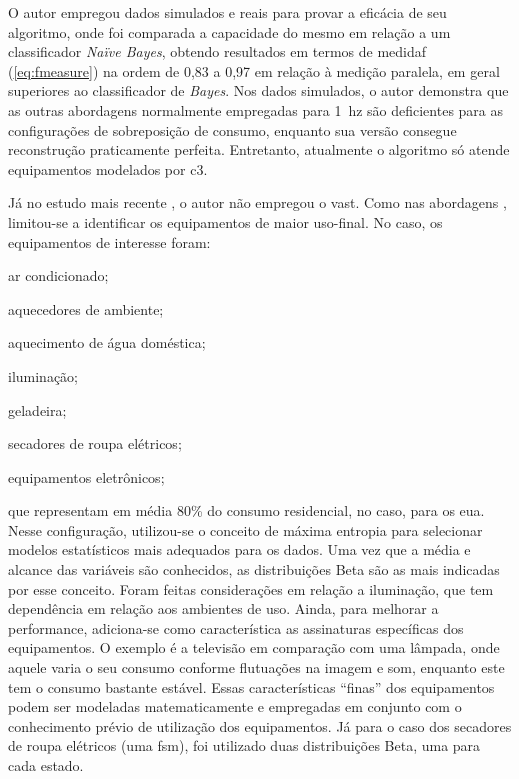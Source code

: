 \begin{enumerate}[label=\textbf{1.\arabic*},wide=\parindent]
O autor empregou dados simulados e reais para provar a eficácia de seu
algoritmo, onde foi comparada a capacidade do mesmo em relação a um
classificador \emph{Naïve Bayes}, obtendo resultados em termos de
\acs{medidaf} (\ref{eq:fmeasure}) na ordem de 0,83 a 0,97 em relação à
medição paralela, em geral superiores ao classificador de
\emph{Bayes}. Nos dados simulados, o autor demonstra que as outras
abordagens normalmente empregadas para 1~\acs{hz} são deficientes para
as configurações de sobreposição de consumo, enquanto sua versão
consegue reconstrução praticamente perfeita. Entretanto, atualmente o
algoritmo só atende equipamentos modelados por \gls{c3}.

Já no estudo mais recente
\cite{nilm_zeifman_statistical_naive_enduses_2013}, o autor não
empregou o \gls{vast}. Como nas abordagens \cite{nilm_farinaccio_16ssamp_1999_17,
nilm_marceau_16ssamp_improved_1999_18}, limitou-se a identificar os
equipamentos de maior uso-final. No caso, os equipamentos de interesse foram:
\begin{enumerate*}[label=\itshape\alph*\upshape)]
\item ar condicionado;
\item aquecedores de ambiente;
\item aquecimento de água doméstica;
\item \label{itm:iluminacao} iluminação;
\item geladeira;
\item secadores de roupa elétricos;
\item \label{itm:equipamentoeletronico} equipamentos eletrônicos;
\end{enumerate*} que representam em média 80\% do consumo residencial,
no caso, para os \gls{eua}. Nesse configuração, utilizou-se o conceito
de máxima entropia para selecionar modelos estatísticos mais adequados
para os dados. Uma vez que a média e alcance das variáveis são conhecidos,
as distribuições Beta são as mais indicadas por esse conceito. Foram
feitas considerações em relação a iluminação, que tem dependência em
relação aos ambientes de uso. Ainda, para melhorar a performance,
adiciona-se como característica as assinaturas específicas dos
equipamentos. O exemplo é a televisão em comparação com uma lâmpada, onde
aquele varia o seu consumo conforme flutuações na imagem e som,
enquanto este tem o consumo bastante estável. Essas
características ``finas'' dos equipamentos podem ser modeladas
matematicamente e empregadas em conjunto com o conhecimento prévio de
utilização dos equipamentos. Já para o caso dos secadores de roupa
elétricos (uma \gls{fsm}), foi utilizado duas distribuições Beta, uma
para cada estado.


\end{enumerate}
